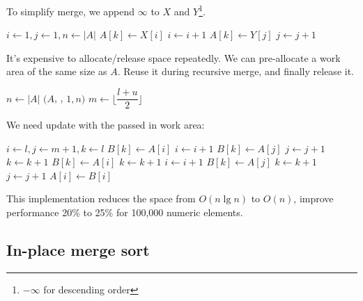 \documentclass[b5paper]{article}
\begin{document}
To simplify merge, we append $\infty$ to $X$ and $Y$\footnote{$-\infty$ for descending order}.

\begin{algorithmic}[1]
  \State {}
  \State {}
  \State $i \gets 1, j\gets 1, n \gets |A|$
      \State $A[k] \gets X[i]$
      \State $i \gets i + 1$
    \Else
      \State $A[k] \gets Y[j]$
      \State $j \gets j + 1$
    \EndIf
  \EndFor
\EndProcedure
\end{algorithmic}

It's expensive to allocate/release space repeatedly\cite{Bentley}. We can pre-allocate a work area of the same size as $A$. Reuse it during recursive merge, and finally release it.

\begin{algorithmic}[1]
  \State $n \gets |A|$
  \State {}$(A$, , $1, n)$
\EndProcedure
\Statex
{}
    \State $m \gets \lfloor \dfrac{l + u}{2} \rfloor$
    \State {}
    \State {}
    \State {}
  \EndIf
\EndProcedure
\end{algorithmic}

We need update  with the passed in work area:

\begin{algorithmic}[1]
  \State $i \gets l, j \gets m + 1, k \gets l$
      \State $B[k] \gets A[i]$
      \State $i \gets i + 1$
    \Else
      \State $B[k] \gets A[j]$
      \State $j \gets j + 1$
    \EndIf
    \State $k \gets k + 1$
  \EndWhile
    \State $B[k] \gets A[i]$
    \State $k \gets k + 1$
    \State $i \gets i + 1$
  \EndWhile
    \State $B[k] \gets A[j]$
    \State $k \gets k + 1$
    \State $j \gets j + 1$
  \EndWhile
   
    \State $A[i] \gets B[i]$
  \EndFor
\EndProcedure
\end{algorithmic}

This implementation reduces the space from $O(n \lg n)$ to $O(n)$, improve performance 20\% to 25\% for 100,000 numeric elements.

\subsection{In-place merge sort}
\end{document}
